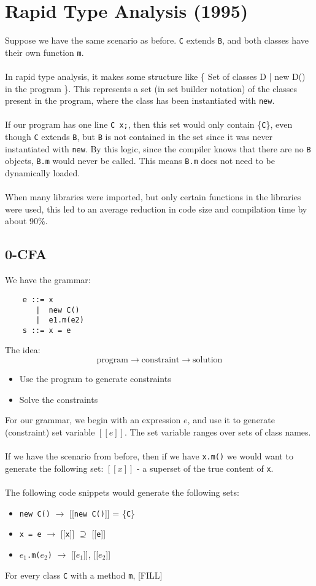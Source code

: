\documentclass[10pt]{article}
\begin{document}
\section*{Rapid Type Analysis (1995)}
Suppose we have the same scenario as before.  \texttt{C} extends \texttt{B}, and both classes have their own function \texttt{m}.\\\\
In rapid type analysis, it makes some structure like \{ Set of classes D | new D() in the program \}.  This represents a set (in set builder notation) of the classes present in the program, where the class has been instantiated with \texttt{new}.\\\\
If our program has one line \texttt{C x;}, then this set would only contain \{\texttt{C}\}, even though \texttt{C} extends \texttt{B}, but \texttt{B} is not contained in the set since it was never instantiated with \texttt{new}.  By this logic, since the compiler knows that there are no \texttt{B} objects, \texttt{B.m} would never be called.  This means \texttt{B.m} does not need to be dynamically loaded.\\\\
When many libraries were imported, but only certain functions in the libraries were used, this led to an average reduction in code size and compilation time by about 90\%.

\subsection*{0-CFA}
We have the grammar:
\begin{verbatim}
    e ::= x
       |  new C()
       |  e1.m(e2)
    s ::= x = e
\end{verbatim}
The idea:
\[\boxed{\text{program}} \longrightarrow \boxed{\text{constraint}} \longrightarrow \boxed{\text{solution}}\]
\begin{itemize}
    \item Use the program to generate constraints
    \item Solve the constraints
\end{itemize}
For our grammar, we begin with an expression $e$, and use it to generate (constraint) set variable $[[e]]$.  The set variable ranges over sets of class names.\\\\
If we have the scenario from before, then if we have \texttt{x.m()} we would want to generate the following set: $[[x]]$ - a superset of the true content of \texttt{x}.\\\\
The following code snippets would generate the following sets:
\begin{itemize}
    \item \texttt{new C()} $\rightarrow$ [[\texttt{new C()}]] = \{\texttt{C}\}
    \item \texttt{x = e} $\rightarrow$ [[\texttt{x}]] $\supseteq$ [[\texttt{e}]]
    \item \texttt{$e_1$.m($e_2$)} $\rightarrow$ [[$e_1$]], [[$e_2$]]
\end{itemize}
For every class \texttt{C} with a method \texttt{m}, [FILL]
\end{document}
